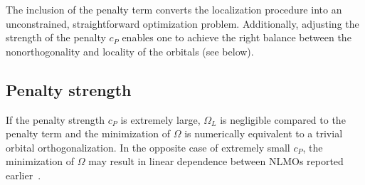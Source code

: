 \documentclass[aps,prl,reprint,amsmath,amssymb]{revtex4-1}
\begin{document}
The inclusion of the penalty term converts the localization procedure into an unconstrained, straightforward optimization problem. Additionally, adjusting the strength of the penalty $c_P$ enables one to achieve the right balance between the nonorthogonality and locality of the orbitals (see below). 

\subsection{Penalty strength}

If the penalty strength $c_P$ is extremely large, $\Omega_L$ is negligible compared to the penalty term and the minimization of $\Omega$ is numerically equivalent to a trivial orbital orthogonalization. In the opposite case of extremely small $c_P$, the minimization of $\Omega$ may result in linear dependence between NLMOs reported earlier~\cite{cui2010efficient}. 
\end{document}
